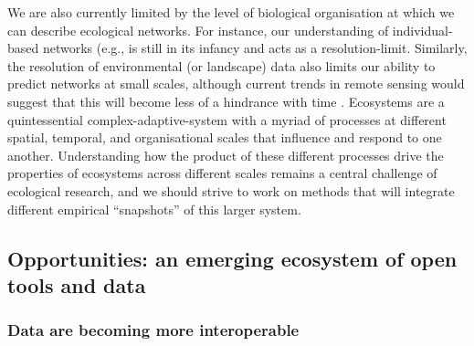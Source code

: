 We are also currently limited by the level of biological organisation at
which we can describe ecological networks. For instance, our
understanding of individual-based networks (e.g., \cite{Araujo2008NetAna,
Tinker2012StrMec} is still in its infancy \cite{Guimaraes2020StrEco}
and acts as a resolution-limit. Similarly, the resolution of
environmental (or landscape) data also limits our ability to predict
networks at small scales, although current trends in remote sensing
would suggest that this will become less of a hindrance with time
\cite{Makiola2020KeyQue}. Ecosystems are a quintessential
complex-adaptive-system \cite{Levin1998EcoBio} with a myriad of
processes at different spatial, temporal, and organisational scales that
influence and respond to one another. Understanding how the product of
these different processes drive the properties of ecosystems across
different scales remains a central challenge of ecological research, and
we should strive to work on methods that will integrate different
empirical ``snapshots'' of this larger system.

\subsection{Opportunities: an emerging ecosystem of open tools and
data}\label{opportunities-an-emerging-ecosystem-of-open-tools-and-data}

\subsubsection{Data are becoming more
interoperable}\label{data-are-becoming-more-interoperable}

